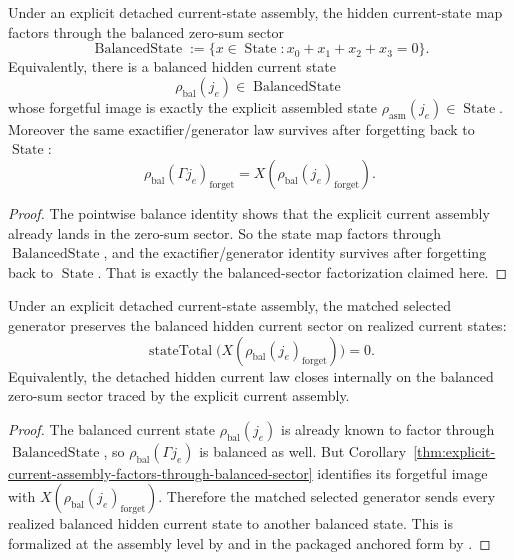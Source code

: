 \begin{corollary}
\label{thm:explicit-current-assembly-factors-through-balanced-sector}
Under an explicit detached current-state assembly, the hidden current-state map
factors through the balanced zero-sum sector
\[
\operatorname{BalancedState}
:=
\{x\in\operatorname{State} : x_0+x_1+x_2+x_3=0\}.
\]
Equivalently, there is a balanced hidden current state
\[
\rho_{\mathrm{bal}}(j_e)\in\operatorname{BalancedState}
\]
whose forgetful image is exactly the explicit assembled state
\(\rho_{\mathrm{asm}}(j_e)\in\operatorname{State}\). Moreover the same
exactifier/generator law survives after forgetting back to
\(\operatorname{State}\):
\[
\rho_{\mathrm{bal}}(\Gamma j_e)_{\mathrm{forget}}
=
X(\rho_{\mathrm{bal}}(j_e)_{\mathrm{forget}}).
\]
\end{corollary}

\begin{proof}
The pointwise balance identity shows that the explicit current assembly already
lands in the zero-sum sector. So the state map factors through
\(\operatorname{BalancedState}\), and the exactifier/generator identity
survives after forgetting back to \(\operatorname{State}\). That is exactly the
balanced-sector factorization claimed here.
\end{proof}

\begin{corollary}
\label{thm:explicit-hidden-current-law-closes-on-the-balanced-sector}
Under an explicit detached current-state assembly, the matched selected
generator preserves the balanced hidden current sector on realized current
states:
\[
\operatorname{stateTotal}
\bigl(
X(\rho_{\mathrm{bal}}(j_e)_{\mathrm{forget}})
\bigr)
=
0.
\]
Equivalently, the detached hidden current law closes internally on the
balanced zero-sum sector traced by the explicit current assembly.
\end{corollary}

\begin{proof}
The balanced current state \(\rho_{\mathrm{bal}}(j_e)\) is already known to
factor through \(\operatorname{BalancedState}\), so
\(\rho_{\mathrm{bal}}(\Gamma j_e)\) is balanced as well. But
Corollary~\ref{thm:explicit-current-assembly-factors-through-balanced-sector}
identifies its forgetful image with
\(X(\rho_{\mathrm{bal}}(j_e)_{\mathrm{forget}})\). Therefore the matched
selected generator sends every realized balanced hidden current state to
another balanced state. This is formalized at the assembly level by
 and in
the packaged anchored form by
.
\end{proof}

